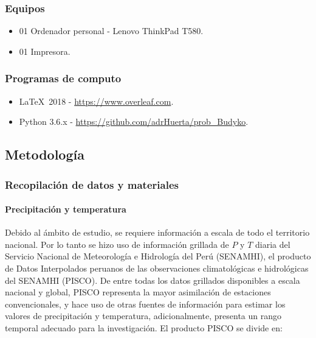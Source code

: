 \documentclass[12pt]{article}
\begin{document}
\subsubsection{Equipos}

\begin{itemize}
  \item 01 Ordenador personal - Lenovo ThinkPad T580.
  \item 01 Impresora.
\end{itemize}

\subsubsection{Programas de computo}

\begin{itemize}
  \item \LaTeX\  2018 - \url{https://www.overleaf.com}.
  \item Python 3.6.x - \url{https://github.com/adrHuerta/prob_Budyko}.
\end{itemize}

\subsection{Metodología}

\subsubsection{Recopilación de datos y materiales}

\paragraph{Precipitación y temperatura}\mbox{}

Debido al ámbito de estudio, se requiere información a escala de todo el territorio nacional. Por lo tanto se hizo uso de información grillada de $P$ y $T$ diaria del Servicio Nacional de Meteorología e Hidrología del Perú (SENAMHI), el producto de Datos Interpolados peruanos de las observaciones climatológicas e hidrológicas del SENAMHI (PISCO). De entre todas los datos grillados disponibles a escala nacional y global, PISCO representa la mayor asimilación de estaciones convencionales, y hace uso de otras fuentes de información para estimar los valores de precipitación y temperatura, adicionalmente, presenta un rango temporal adecuado para la investigación. El producto PISCO se divide en:
\end{document}

